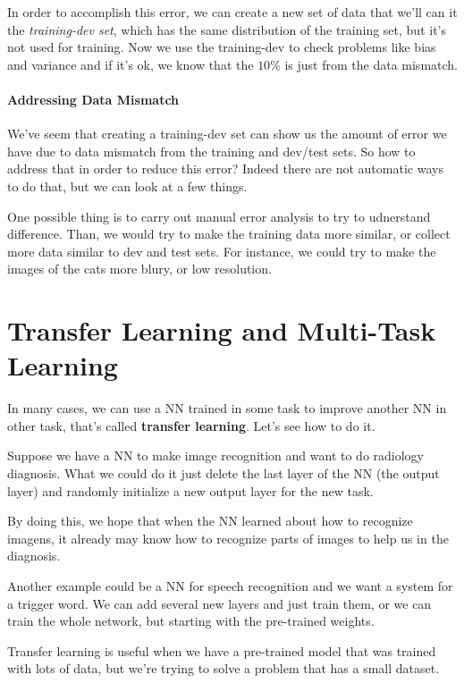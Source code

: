 \documentclass[12pt, a4paper, oneside]{book}
\begin{document}
In order to accomplish this error, we can create a new set of data that we'll
can it the \textit{training-dev set}, which has the same distribution of the
training set, but it's not used for training. Now we use the training-dev to
check problems like bias and variance and if it's ok, we know that the $10\%$ is
just from the data mismatch.

\paragraph{Addressing Data Mismatch}%
\label{par:addressing_data_mismatch}

We've seem that creating a training-dev set can show us the amount of error we
have due to data mismatch from the training and dev/test sets. So how to address
that in order to reduce this error? Indeed there are not automatic ways to do
that, but we can look at a few things.

One possible thing is to carry out manual error analysis to try to udnerstand
difference. Than, we would try to make the training data more similar, or
collect more data similar to dev and test sets. For instance, we could try to
make the images of the cats more blury, or low resolution.

\section{Transfer Learning and Multi-Task Learning}%
\label{sec:transfer_learning_and_multi_task_learning}

In many cases, we can use a NN trained in some task to improve another NN in
other task, that's called \textbf{transfer learning}. Let's see how to do it.

Suppose we have a NN to make image recognition and want to do radiology
diagnosis. What we could do it just delete the last layer of the NN (the output
layer) and randomly initialize a new output layer for the new task.

By doing this, we hope that when the NN learned about how to recognize imagens,
it already may know how to recognize parts of images to help us in the
diagnosis.

Another example could be a NN for speech recognition and we want a system for a
trigger word. We can add several new layers and just train them, or we can train
the whole network, but starting with the pre-trained weights.

Transfer learning is useful when we have a pre-trained model that was trained
with lots of data, but we're trying to solve a problem that has a small
dataset. \jump
\end{document}
